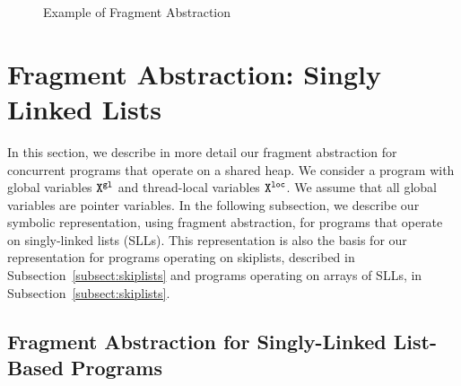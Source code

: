 \begin{center}
\begin{figure}

\caption{Example of Fragment Abstraction}
\label{lazylist}
\end{figure}
\end{center}
\section{Fragment Abstraction: Singly Linked Lists}
\label{sec:fragment-abstraction}
In this section, we describe in more detail our fragment abstraction for
concurrent programs that operate on a shared heap.
We consider a program with global variables ${\tt X}^{\tt gl}$ and
thread-local variables ${\tt X}^{\tt loc}$.
We assume that all global variables are pointer variables.
In the following subsection, we describe our symbolic representation, using fragment
abstraction, for programs that operate on singly-linked lists (SLLs). This
representation is also the basis for our representation for programs
operating on skiplists, described in Subsection~\ref{subsect:skiplists}
and programs operating on arrays of SLLs, in Subsection~\ref{subsect:skiplists}.




\subsection{Fragment Abstraction for Singly-Linked List-Based Programs}

